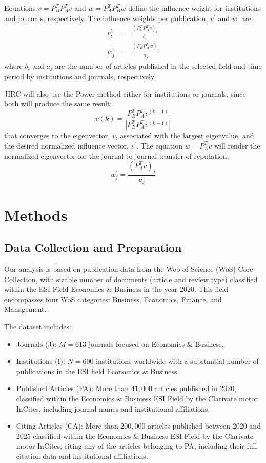 \documentclass[10pt]{article}
\begin{document}
Equations $v=P_B^TP_A^Tv$ and $w=P_A^TP_B^Tw$ define the influence weight for institutions and journals, respectively. The influence weights per
publication, $v^{\prime}$ and $w^{\prime}$ are:
\begin{eqnarray*}
v^{\prime}_i &=& \frac{(P_B^TP_A^Tv)_i}{b_{i}} \\
w^{\prime}_j &=& \frac{(P_B^TP_A^Tw)_j}{a_{j}}
\end{eqnarray*}
where $b_i$ and $a_j$ are the number of articles published  in the selected field and time period by institutions and journals, respectively.


\noindent JIRC will also  use the Power method either for institutions or journals, since both will produce the same result:
\begin{equation}
v(k)=\frac{P_B^TP_A^Tv^{(k-1)}}{|P_B^TP_A^Tv^{(k-1)}|}
\label{pm}
\end{equation}
that converges to the eigenvector, $v$, associated with the largest eigenvalue,  and the desired normalized influence vector, $v^{\prime}$. The equation $w=P_A^Tv$ will render the normalized eigenvector for the journal to journal transfer of reputation,
\begin{equation}
w^{\prime}_j =
\frac{(P_A^Tv)_j}{a_{j}}
\end{equation}
\section{Methods}

\subsection{Data Collection and Preparation}
Our analysis is based on publication data from the Web of Science (WoS) Core Collection,  with sizable number of documents  (article and review type) classified within the ESI Field Economics \& Business in the year 2020. This field encompasses four WoS categories: Business, Economics, Finance, and Management.

The dataset includes:
\begin{itemize}
\item Journals (J): $M =613$ journals focused on Economics \& Business.
\item Institutions (I): $N =600$ institutions worldwide with a substantial number of publications in the ESI field Economics \& Business.
\item Published Articles (PA): More than $41,000$ articles published in 2020, classified within the Economics \& Business ESI Field by the Clarivate motor InCites, including journal names and institutional affiliations.
\item Citing Articles (CA): More than $200,000$ articles published between 2020 and 2025  classified within the Economics \& Business ESI Field by the Clarivate motor InCites, citing any of the  articles belonging to PA, including their full citation data and institutional affiliations.
    \end{itemize}
\end{document}
